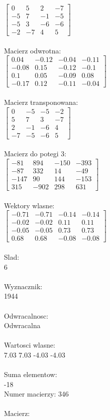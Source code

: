 \documentclass[a4paper,12pt]{article}
\begin{document}
$\begin{bmatrix} 0&5&2&-7\\-5&7&-1&-5\\-5&3&-6&-6\\-2&-7&4&5 \end{bmatrix}$
\\
\\
Macierz odwrotna:\\

$\begin{bmatrix} 0.04&-0.12&-0.04&-0.11\\-0.08&0.15&-0.12&-0.1\\0.1&0.05&-0.09&0.08\\-0.17&0.12&-0.11&-0.04 \end{bmatrix}$
\\
\\
Macierz transponowana:\\

$\begin{bmatrix} 0&-5&-5&-2\\5&7&3&-7\\2&-1&-6&4\\-7&-5&-6&5 \end{bmatrix}$
\\
\\
Macierz do potegi 3:\\

$\begin{bmatrix} -81&894&-150&-393\\-87&332&14&-49\\-147&90&144&-153\\315&-902&298&631 \end{bmatrix}$
\\
\\
Wektory wlasne:\\

$\begin{bmatrix} -0.71&-0.71&-0.14&-0.14\\-0.02&-0.02&0.11&0.11\\-0.05&-0.05&0.73&0.73\\0.68&0.68&-0.08&-0.08 \end{bmatrix}$
\\
\\
Slad:\\
6
\\
\\
Wyznacznik:\\
1944
\\
\\
Odwracalnosc:\\
Odwracalna
\\
\\
Wartosci wlasne:\\
7.03 7.03 -4.03 -4.03
\\
\\
Suma elementow:\\
-18
\\
\newpage
Numer macierzy:
346
\\
\\
Macierz:\\
\end{document}
